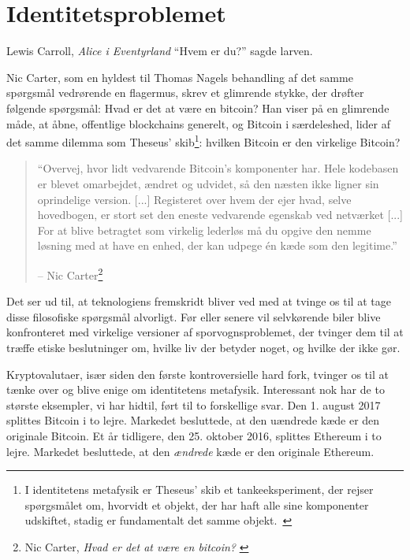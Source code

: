 \chapter{Identitetsproblemet}
\label{les:4}

\begin{chapquote}{Lewis Carroll, \textit{Alice i Eventyrland}}
\enquote{Hvem er du?} sagde larven.
\end{chapquote}

Nic Carter, som en hyldest til Thomas Nagels behandling af det samme spørgsmål vedrørende en flagermus, skrev et glimrende stykke, der drøfter følgende spørgsmål: Hvad er det at være en bitcoin? Han viser på en glimrende måde, at åbne, offentlige blockchains generelt, og Bitcoin i særdeleshed, lider af det samme dilemma som Theseus' skib\footnote{I identitetens metafysik er Theseus' skib et tankeeksperiment, der rejser spørgsmålet om, hvorvidt et objekt, der har haft alle sine komponenter udskiftet, stadig er fundamentalt det samme objekt.~\cite{wiki:theseus}}: hvilken Bitcoin er den virkelige Bitcoin?

\begin{quotation}\begin{samepage}
\enquote{Overvej, hvor lidt vedvarende Bitcoin's komponenter har. Hele kodebasen er blevet omarbejdet, ændret og udvidet, så den næsten ikke ligner sin oprindelige version. [...] Registeret over hvem der ejer hvad, selve hovedbogen, er stort set den eneste vedvarende egenskab ved netværket [...]
For at blive betragtet som virkelig lederløs må du opgive den nemme løsning med at have en enhed, der kan udpege én kæde som den legitime.}
\begin{flushright} -- Nic Carter\footnote{Nic Carter, \textit{Hvad er det at være en bitcoin?} \cite{bitcoin-identity}}
\end{flushright}\end{samepage}\end{quotation}

Det ser ud til, at teknologiens fremskridt bliver ved med at tvinge os til at tage 
disse filosofiske spørgsmål alvorligt. Før eller senere vil selvkørende biler blive 
konfronteret med virkelige versioner af sporvognsproblemet, der tvinger dem til at 
træffe etiske beslutninger om, hvilke liv der betyder noget, og hvilke der ikke gør.

Kryptovalutaer, især siden den første kontroversielle hard fork, tvinger os til at 
tænke over og blive enige om identitetens metafysik. Interessant nok har de to 
største eksempler, vi har hidtil, ført til to forskellige svar. Den 1. august 2017 
splittes Bitcoin i to lejre. Markedet besluttede, at den uændrede kæde er den 
originale Bitcoin. Et år tidligere, den 25. oktober 2016, splittes Ethereum i to 
lejre. Markedet besluttede, at den \textit{ændrede} kæde er den originale Ethereum.

